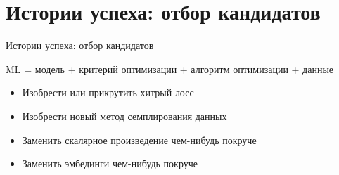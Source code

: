 \documentclass[11pt,aspectratio=169]{beamer}
\begin{document}
\section{Истории успеха: отбор кандидатов}

\begin{frame}{Истории успеха: отбор кандидатов}

ML = модель + критерий оптимизации + алгоритм оптимизации + данные

\vfill

\begin{tcolorbox}[colback=info!5,colframe=info!80,title=Как оставить след в науке]
\pause
\begin{itemize}
\item Изобрести или прикрутить хитрый лосс \pause
\item Изобрести новый метод семплирования данных \pause
\item Заменить скалярное произведение чем-нибудь покруче \pause
\item Заменить эмбединги чем-нибудь покруче
\end{itemize}
\end{tcolorbox}

\end{frame}
\end{document}
